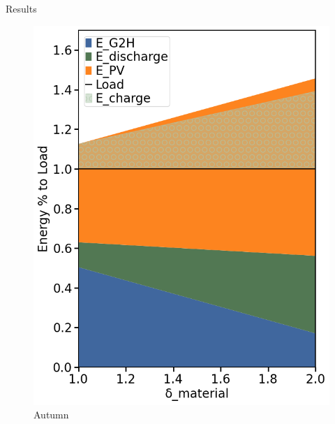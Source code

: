 \begin{frame}[c]{Results}
\begin{itemize}
\begin{figure}[htbp]
\begin{minipage}{0.24\linewidth}
                    \includegraphics[width=\linewidth]{Figures/autumn.png}
                    \footnotesize
                    \caption{Autumn}
                \end{minipage}\hfill
                \begin{minipage}{0.24\linewidth}

\end{minipage}
\end{figure}
\end{itemize}
\end{frame}
